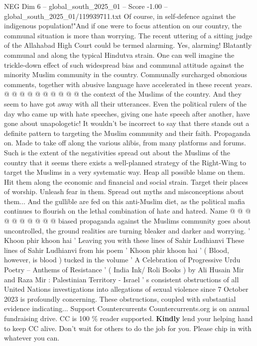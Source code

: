 \begin{textsample}{NEG Dim 6 – global\_south\_2025\_01 – Score -1.00 – global\_south\_2025\_01/119939711.txt}
Of course, in self-defence against the indigenous population!"And if one were to focus attention on our country, the communal situation is more than worrying.
The recent uttering of a sitting judge of the Allahabad High Court could be termed alarming.
Yes, alarming!
Blatantly communal and along the typical Hindutva strain.
One can well imagine the trickle-down effect of such widespread bias and communal attitude against the minority Muslim community in the country.
Communally surcharged obnoxious comments, together with abusive language have accelerated in these recent years. @ @ @ @ @ @ @ @ @ @ the context of the Muslims of the country.
And they seem to have got away with all their utterances.
Even the political rulers of the day who came up with hate speeches, giving one hate speech after another, have gone about unapologetic!
It wouldn't be incorrect to say that there stands out a definite pattern to targeting the Muslim community and their faith.
Propaganda on.
Made to take off along the various alibis, from many platforms and forums.
Such is the extent of the negativities spread out about the Muslims of the country that it seems there exists a well-planned strategy of the Right-Wing to target the Muslims in a very systematic way.
Heap all possible blame on them.
Hit them along the economic and financial and social strain.
Target their places of worship.
Unleash fear in them.
Spread out myths and misconceptions about them...
And the gullible are fed on this anti-Muslim diet, as the political mafia continues to flourish on the lethal combination of hate and hatred.
Name @ @ @ @ @ @ @ @ @ @ biased propaganda against the Muslims community goes about uncontrolled, the ground realities are turning bleaker and darker and worrying. ' Khoon phir khoon hai ' Leaving you with these lines of Sahir Ludhianvi These lines of Sahir Ludhianvi from his poem ' Khoon phir khoon hai ' ( Blood, however, is blood ) tucked in the volume ' A Celebration of Progressive Urdu Poetry -- Anthems of Resistance ' ( India Ink/ Roli Books ) by Ali Husain Mir and Raza Mir : Palestinian Territory - Israel ' s consistent obstructions of all United Nations investigations into allegations of sexual violence since 7 October 2023 is profoundly concerning.
These obstructions, coupled with substantial evidence indicating...
Support Countercurrents Countercurrents.org is on annual fundraising drive.
CC is 100 \% reader supported. \textbf{Kindly} lend your helping hand to keep CC alive.
Don't wait for others to do the job for you.
Please chip in with whatever you can.

\end{textsample}
